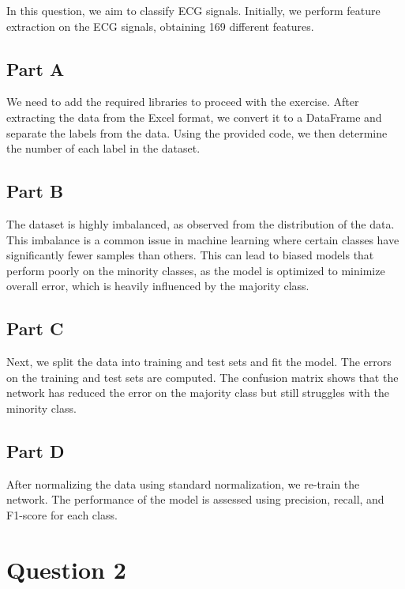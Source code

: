 \documentclass[DIV=calc, paper=a4, fontsize=11pt, twocolumn]{scrartcl}	 %
\begin{document}
In this question, we aim to classify ECG signals. Initially, we perform feature extraction 
on the ECG signals, obtaining 169 different features.

  \subsection*{\small{Part A}}

    We need to add the required libraries to proceed with the exercise. After extracting the 
    data from the Excel format, we convert it to a DataFrame and separate the labels from the 
    data. Using the provided code, we then determine the number of each label in the dataset.

  \subsection*{\small{Part B}}

    The dataset is highly imbalanced, as observed from the distribution of the data. This imbalance 
    is a common issue in machine learning where certain classes have significantly fewer samples 
    than others. This can lead to biased models that perform poorly on the minority classes, as the 
    model is optimized to minimize overall error, which is heavily influenced by the majority class.

  \subsection*{\small{Part C}}

    Next, we split the data into training and test sets and fit the model. The errors on the training 
    and test sets are computed. The confusion matrix shows that the network has reduced the error on 
    the majority class but still struggles with the minority class.

  \subsection*{\small{Part D}}

    After normalizing the data using standard normalization, we re-train the network. The performance 
    of the model is assessed using precision, recall, and F1-score for each class.

\section*{\small{Question 2}}
\end{document}
